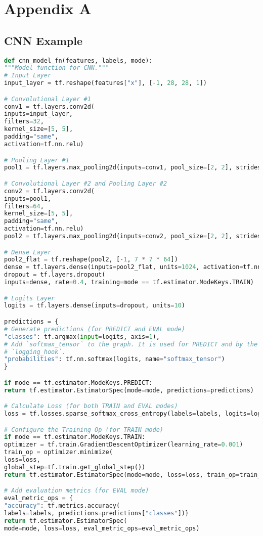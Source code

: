 %
%

\chapter{Appendix A}


\section{CNN Example}
\label{app:app01}
\begin{lstlisting}[language=Python, caption=Simple CNN  implementation using Tensorflow in Python \cite{abadi2016tensorflow}]
def cnn_model_fn(features, labels, mode):
"""Model function for CNN."""
# Input Layer
input_layer = tf.reshape(features["x"], [-1, 28, 28, 1])

# Convolutional Layer #1
conv1 = tf.layers.conv2d(
inputs=input_layer,
filters=32,
kernel_size=[5, 5],
padding="same",
activation=tf.nn.relu)

# Pooling Layer #1
pool1 = tf.layers.max_pooling2d(inputs=conv1, pool_size=[2, 2], strides=2)

# Convolutional Layer #2 and Pooling Layer #2
conv2 = tf.layers.conv2d(
inputs=pool1,
filters=64,
kernel_size=[5, 5],
padding="same",
activation=tf.nn.relu)
pool2 = tf.layers.max_pooling2d(inputs=conv2, pool_size=[2, 2], strides=2)

# Dense Layer
pool2_flat = tf.reshape(pool2, [-1, 7 * 7 * 64])
dense = tf.layers.dense(inputs=pool2_flat, units=1024, activation=tf.nn.relu)
dropout = tf.layers.dropout(
inputs=dense, rate=0.4, training=mode == tf.estimator.ModeKeys.TRAIN)

# Logits Layer
logits = tf.layers.dense(inputs=dropout, units=10)

predictions = {
# Generate predictions (for PREDICT and EVAL mode)
"classes": tf.argmax(input=logits, axis=1),
# Add `softmax_tensor` to the graph. It is used for PREDICT and by the
# `logging_hook`.
"probabilities": tf.nn.softmax(logits, name="softmax_tensor")
}

if mode == tf.estimator.ModeKeys.PREDICT:
return tf.estimator.EstimatorSpec(mode=mode, predictions=predictions)

# Calculate Loss (for both TRAIN and EVAL modes)
loss = tf.losses.sparse_softmax_cross_entropy(labels=labels, logits=logits)

# Configure the Training Op (for TRAIN mode)
if mode == tf.estimator.ModeKeys.TRAIN:
optimizer = tf.train.GradientDescentOptimizer(learning_rate=0.001)
train_op = optimizer.minimize(
loss=loss,
global_step=tf.train.get_global_step())
return tf.estimator.EstimatorSpec(mode=mode, loss=loss, train_op=train_op)

# Add evaluation metrics (for EVAL mode)
eval_metric_ops = {
"accuracy": tf.metrics.accuracy(
labels=labels, predictions=predictions["classes"])}
return tf.estimator.EstimatorSpec(
mode=mode, loss=loss, eval_metric_ops=eval_metric_ops)

\end{lstlisting}

